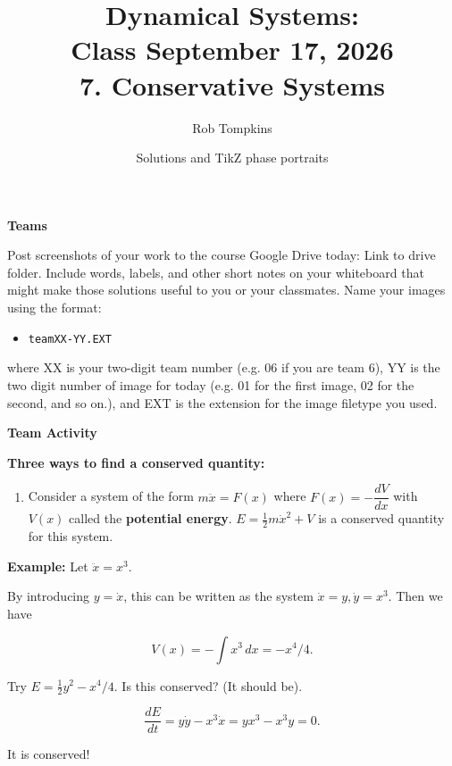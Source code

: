 \documentclass[12pt]{amsart}
\title{Dynamical Systems:\\Class September 17, 2026\\ 7. Conservative Systems}
\author{Rob Tompkins}
\date{Solutions and TikZ phase portraits}
\theoremstyle{plain}
\theoremstyle{definition}
\theoremstyle{definition}
\theoremstyle{plain}
\begin{document}
    \maketitle
    {\large\bfseries Teams}

    Post screenshots of your work to the course Google Drive today: Link to drive folder. Include words, labels, and other short notes on your whiteboard that might make those solutions useful to you or your classmates. Name your images using the format:
    \begin{itemize}\item \texttt{teamXX-YY.EXT}\end{itemize}
    where XX is your two-digit team number (e.g. 06 if you are team 6), YY is the two digit number of image for today (e.g. 01 for the first image, 02 for the second, and so on.), and EXT is the extension for the image filetype you used.
    \par\medskip
    {\large\bfseries Team Activity}

    \textbf{Three ways to find a conserved quantity:}

    \begin{enumerate}

        \item Consider a system of the form $m\ddot{x}=F(x)$ where $F(x)=-\dfrac{dV}{dx}$ with $V(x)$
        called the \textbf{potential energy}. $E=\frac12 m\dot{x}^{2}+V$ is a conserved quantity for
        this system.

    \end{enumerate}

    \textbf{Example:} Let $\ddot{x}=x^3$.

    By introducing $y=\dot{x}$, this can be written as the system $\dot{x}=y,\dot{y}=x^3$. Then we have

    \[
        V(x)=-\int x^3\,dx=-x^4/4.
    \]

    Try $E=\frac12 y^2-x^4/4$. Is this conserved? (It should be).

    \[
        \frac{dE}{dt}=y\dot{y}-x^3\dot{x}=yx^3-x^3y=0.
    \]

    It is conserved!
\end{document}
